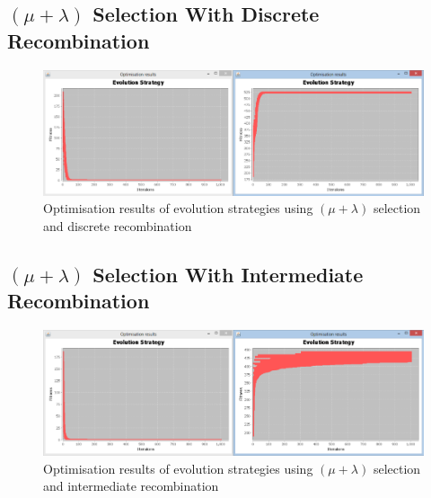 \begin{landscape}
\subsection{$(\mu+\lambda)$ Selection With Discrete Recombination}
\label{sec:appendix15}
  \begin{figure}[h]
    \begin{center}
      \includegraphics{Figures/es_plus_d}
    \end{center}
    \caption{Optimisation results of evolution strategies using $(\mu+\lambda)$ selection and discrete recombination}
    \label{fig:phase1}
  \end{figure}
\end{landscape}

\begin{landscape}
\subsection{$(\mu+\lambda)$ Selection With Intermediate Recombination}
\label{sec:appendix16}
  \begin{figure}[h]
    \begin{center}
      \includegraphics{Figures/es_plus_i}
    \end{center}
    \caption{Optimisation results of evolution strategies using $(\mu+\lambda)$ selection and intermediate recombination}
    \label{fig:phase1}
  \end{figure}
\end{landscape}

